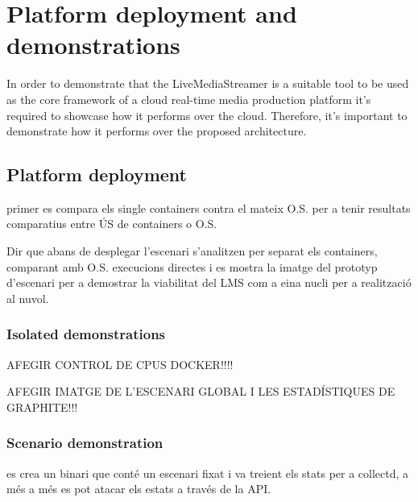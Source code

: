 \chapter{Platform deployment and demonstrations}\label{H:platformDeploymentAndDemonstrations}

In order to demonstrate that the LiveMediaStreamer is a suitable tool to be used as the core framework of a cloud real-time media production platform it's required to showcase how it performs over the cloud. Therefore, it's important to demonstrate how it performs over the proposed architecture.

\section{Platform deployment}

primer es compara els single containers contra el mateix O.S. per a tenir resultats comparatius entre ÚS de containers o O.S.

Dir que abans de desplegar l'escenari s'analitzen per separat els containers, comparant amb O.S. execucions directes i es mostra la imatge del prototyp d'escenari per a demostrar la viabilitat del LMS com a eina nucli per a realització al nuvol.

\subsection{Isolated demonstrations}


AFEGIR CONTROL DE CPUS DOCKER!!!!

AFEGIR IMATGE DE L'ESCENARI GLOBAL I LES ESTADÍSTIQUES DE GRAPHITE!!!

\subsection{Scenario demonstration}

es crea un binari que conté un escenari fixat i va treient els stats per a collectd, a  més a més es pot atacar els estats a través de la API.
